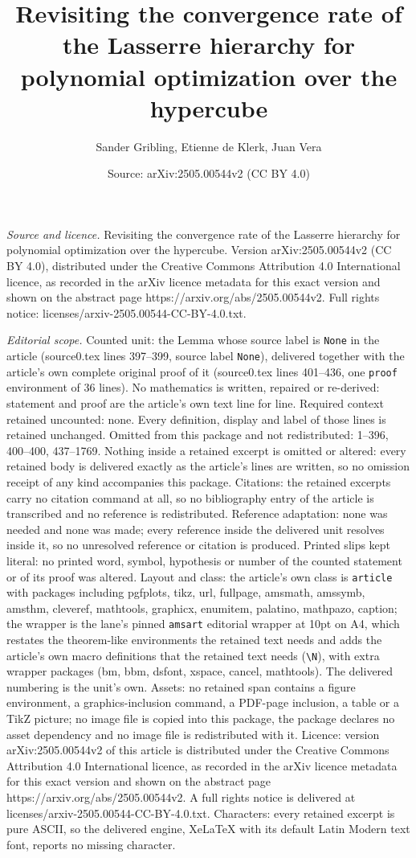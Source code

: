 \documentclass[10pt,a4paper]{amsart}
\title[Revisiting the convergence rate of the Lasserre hierarchy fo]{Revisiting the convergence rate of the Lasserre hierarchy for polynomial optimization over the hypercube}
\author{Sander Gribling, Etienne de Klerk, Juan Vera}
\date{Source: arXiv:2505.00544v2 (CC BY 4.0)}
\begin{document}
\maketitle

\noindent\emph{Source and licence.} Revisiting the convergence rate of the Lasserre hierarchy for polynomial optimization over the hypercube. Version arXiv:2505.00544v2 (CC BY 4.0), distributed under the Creative Commons Attribution 4.0 International licence, as recorded in the arXiv licence metadata for this exact version and shown on the abstract page https://arxiv.org/abs/2505.00544v2. Full rights notice: licenses/arxiv-2505.00544-CC-BY-4.0.txt.\par\smallskip

\noindent\textit{Editorial scope.} Counted unit: the Lemma whose source label is \texttt{None} in the article (source0.tex lines 397--399, source label \texttt{None}), delivered together with the article's own complete original proof of it (source0.tex lines 401--436, one \texttt{proof} environment of 36 lines). No mathematics is written, repaired or re-derived: statement and proof are the article's own text line for line. Required context retained uncounted: none. Every definition, display and label of those lines is retained unchanged. Omitted from this package and not redistributed: 1--396, 400--400, 437--1769. Nothing inside a retained excerpt is omitted or altered: every retained body is delivered exactly as the article's lines are written, so no omission receipt of any kind accompanies this package. Citations: the retained excerpts carry no citation command at all, so no bibliography entry of the article is transcribed and no reference is redistributed. Reference adaptation: none was needed and none was made; every reference inside the delivered unit resolves inside it, so no unresolved reference or citation is produced. Printed slips kept literal: no printed word, symbol, hypothesis or number of the counted statement or of its proof was altered. Layout and class: the article's own class is \texttt{article} with packages including pgfplots, tikz, url, fullpage, amsmath, amssymb, amsthm, cleveref, mathtools, graphicx, enumitem, palatino, mathpazo, caption; the wrapper is the lane's pinned \texttt{amsart} editorial wrapper at 10pt on A4, which restates the theorem-like environments the retained text needs and adds the article's own macro definitions that the retained text needs (\texttt{\textbackslash N}), with extra wrapper packages (bm, bbm, dsfont, xspace, cancel, mathtools). The delivered numbering is the unit's own. Assets: no retained span contains a figure environment, a graphics-inclusion command, a PDF-page inclusion, a table or a TikZ picture; no image file is copied into this package, the package declares no asset dependency and no image file is redistributed with it. Licence: version arXiv:2505.00544v2 of this article is distributed under the Creative Commons Attribution 4.0 International licence, as recorded in the arXiv licence metadata for this exact version and shown on the abstract page https://arxiv.org/abs/2505.00544v2. A full rights notice is delivered at licenses/arxiv-2505.00544-CC-BY-4.0.txt. Characters: every retained excerpt is pure ASCII, so the delivered engine, XeLaTeX with its default Latin Modern text font, reports no missing character.
\end{document}
